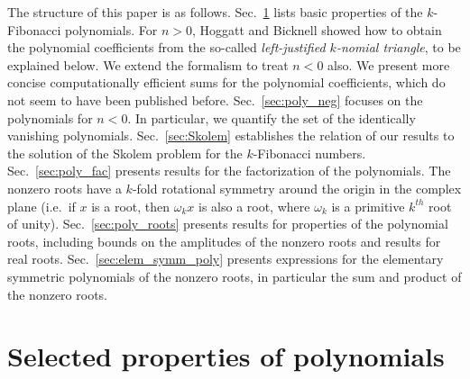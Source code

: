 \documentclass[review]{elsarticle}
\theoremstyle{plain}
\begin{document}
The structure of this paper is as follows.
Sec.~\ref{sec:poly_prop} lists basic properties of the $k$-Fibonacci polynomials.
For $n>0$, Hoggatt and Bicknell \cite{HoggattBicknell_FibGen} showed how to obtain the polynomial coefficients
from the so-called \textit{left-justified $k$-nomial triangle}, to be explained below.
We extend the formalism to treat $n<0$ also.
We present more concise computationally efficient sums for the polynomial coefficients,
which do not seem to have been published before.
Sec.~\ref{sec:poly_neg} focuses on the polynomials for $n<0$.
In particular, we quantify the set of the identically vanishing polynomials.
Sec.~\ref{sec:Skolem} establishes the relation of our results to the solution of the Skolem problem for the $k$-Fibonacci numbers.
Sec.~\ref{sec:poly_fac} presents results for the factorization of the polynomials.
The nonzero roots have a $k$-fold rotational symmetry around the origin in the complex plane
(i.e.~if $x$ is a root, then $\omega_k x$ is also a root, where $\omega_k$ is a primitive $k^{th}$ root of unity).
Sec.~\ref{sec:poly_roots} presents results for properties of the polynomial roots,
including bounds on the amplitudes of the nonzero roots and results for real roots.
Sec.~\ref{sec:elem_symm_poly} presents expressions for the elementary symmetric polynomials of the nonzero roots,
in particular the sum and product of the nonzero roots.

\setcounter{equation}{0}
\section{Selected properties of polynomials}\label{sec:poly_prop}
\end{document}
